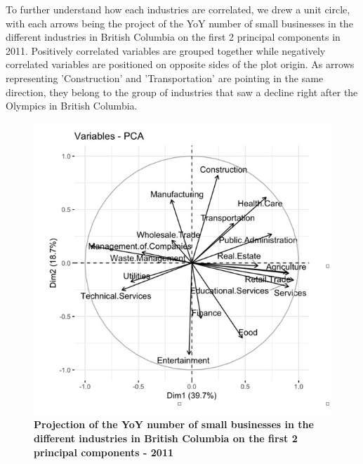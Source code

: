 \documentclass[11pt, twocolumn]{article}
\begin{document}
To further understand how each industries are correlated, we drew a unit circle, with each arrows being the project of the YoY number of small businesses in the different industries in British Columbia on the first 2 principal components in 2011. Positively correlated variables are grouped together while negatively correlated variables are positioned on opposite sides of the plot origin. As arrows representing 'Construction' and 'Transportation' are pointing in the same direction, they belong to the group of industries that saw a decline right after the Olympics in British Columbia. 

\begin{figure}[H]
    \centering
        \includegraphics[scale=0.33]{Correlation circle.jpg}
    \caption{\textbf{Projection of the YoY number of small businesses in the different industries in British Columbia on the first 2 principal components - 2011}}
    \label{fig:Correlation_circle}
\end{figure}
\end{document}
